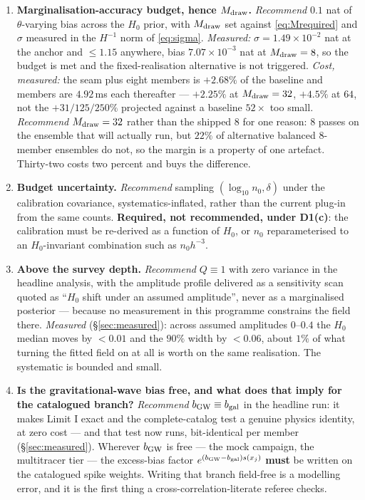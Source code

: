 \documentclass[11pt]{article}
\theoremstyle{definition}
\theoremstyle{remark}
\newcommand{\bgw}{b_{\rm GW}}
\newcommand{\bgal}{b_{\rm gal}}
\newcommand{\Mdraw}{M_{\rm draw}}
\begin{document}
\begin{enumerate}[leftmargin=2.0em,itemsep=3pt]
\item[\bf D5.] \textbf{Marginalisation-accuracy budget, hence $\Mdraw$.}
\emph{Recommend} $0.1$ nat of $\theta$-varying bias across the $H_0$ prior, with
$\Mdraw$ set against \eqref{eq:Mrequired} and $\sigma$ measured in the $H^{-1}$ norm
of \eqref{eq:sigma}. \emph{Measured:} $\sigma=1.49\times10^{-2}$ nat at the anchor and $\le1.15$
anywhere, bias $7.07\times10^{-3}$ nat at $\Mdraw=8$, so the budget is met and the
fixed-realisation alternative is not triggered. \emph{Cost, measured:} the seam
plus eight members is $+2.68\%$ of the baseline and members are $4.92$\,ms each
thereafter --- $+2.25\%$ at $\Mdraw=32$, $+4.5\%$ at $64$, not the $+31/125/250\%$
projected against a baseline $52\times$ too small. \emph{Recommend $\Mdraw=32$}
rather than the shipped $8$ for one reason: $8$ passes on the ensemble that will
actually run, but $22\%$ of alternative balanced $8$-member ensembles do not, so
the margin is a property of one artefact. Thirty-two costs two percent and buys
the difference.

\item[\bf D6.] \textbf{Budget uncertainty.} \emph{Recommend} sampling
$(\log_{10}n_0,\delta)$ under the calibration covariance, systematics-inflated,
rather than the current plug-in from the same counts. \textbf{Required, not
recommended, under D1(c)}: the calibration must be re-derived as a function of $H_0$,
or $n_0$ reparameterised to an $H_0$-invariant combination such as $n_0h^{-3}$.

\item[\bf D7.] \textbf{Above the survey depth.} \emph{Recommend} $Q\equiv1$ with zero
variance in the headline analysis, with the amplitude profile delivered as a
sensitivity scan quoted as ``$H_0$ shift under an assumed amplitude'', never as a
marginalised posterior --- because no measurement in this programme constrains the
field there. \emph{Measured} (\S\ref{sec:measured}): across assumed amplitudes
$0$--$0.4$ the $H_0$ median moves by $<0.01$ and the $90\%$ width by $<0.06$,
about $1\%$ of what turning the fitted field on at all is worth on the same
realisation. The systematic is bounded and small.

\item[\bf D8.] \textbf{Is the gravitational-wave bias free, and what does that imply
for the catalogued branch?} \emph{Recommend} $\bgw\equiv\bgal$ in the headline run:
it makes Limit I exact and the complete-catalog test a genuine physics identity, at
zero cost --- and that test now runs, bit-identical per member (\S\ref{sec:measured}). Wherever $\bgw$ is free --- the mock campaign, the multitracer tier --- the
excess-bias factor $e^{(\bgw-\bgal)s(x_j)}$ \textbf{must} be written on the catalogued
spike weights. Writing that branch field-free is a modelling error, and it is the
first thing a cross-correlation-literate referee checks.


\end{enumerate}
\end{document}
